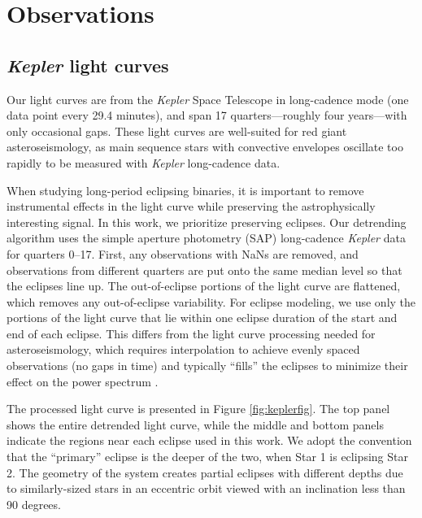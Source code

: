 \section{Observations}\label{data}

\subsection{\emph{Kepler} light curves}\label{kepler}
Our light curves are from the \emph{Kepler} Space Telescope in long-cadence mode (one data point every 29.4 minutes), and span 17 quarters---roughly four years---with only occasional gaps. These light curves are well-suited for red giant asteroseismology, as main sequence stars with convective envelopes oscillate too rapidly to be measured with \emph{Kepler} long-cadence data.

When studying long-period eclipsing binaries, it is important to remove instrumental effects in the light curve while preserving the astrophysically interesting signal. In this work, we prioritize preserving eclipses. Our detrending algorithm uses the simple aperture photometry (SAP) long-cadence \emph{Kepler} data for quarters 0--17. First, any observations with NaNs are removed, and observations from different quarters are put onto the same median level so that the eclipses line up. The out-of-eclipse portions of the light curve are flattened, which removes any out-of-eclipse variability. For eclipse modeling, we use only the portions of the light curve that lie within one eclipse duration of the start and end of each eclipse. This differs from the light curve processing needed for asteroseismology, which requires interpolation to achieve evenly spaced observations (no gaps in time) and typically ``fills'' the eclipses to minimize their effect on the power spectrum \citep{gau14}.

The processed light curve is presented in Figure \ref{fig:keplerfig}. The top panel shows the entire detrended light curve, while the middle and bottom panels indicate the regions near each eclipse used in this work. We adopt the convention that the ``primary'' eclipse is the deeper of the two, when Star 1 is eclipsing Star 2. The geometry of the system creates partial eclipses with different depths due to similarly-sized stars in an eccentric orbit viewed with an inclination less than 90 degrees.
  
  